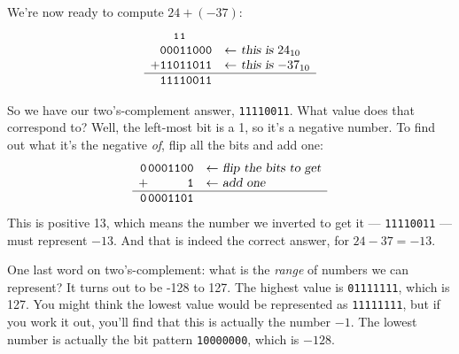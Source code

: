 We're now ready to compute $24 + (-37)$:
\[
\begin{array}{*{9}{c@{\hspace{0pt}}}{l}}
& &   & \texttt{{\footnotesize 1}} & \texttt{{\footnotesize 1}} & & & & \\
   & \texttt{0} & \texttt{0} & \texttt{0} & \texttt{1} & \texttt{1} & \texttt{0} & \texttt{0} & \texttt{0} 
& \quad \textsl{$\leftarrow$ this is $24_{10}$}\\
 + & \texttt{1} & \texttt{1} & \texttt{0} & \texttt{1} & \texttt{1} & \texttt{0} & \texttt{1} & \texttt{1} 
& \quad \textsl{$\leftarrow$ this is $-37_{10}$}\\
\hline
   & \texttt{1} & \texttt{1} & \texttt{1} & \texttt{1} & \texttt{0} & \texttt{0} & \texttt{1} & \texttt{1} & \\
\end{array}
\]

So we have our two's-complement answer, \texttt{11110011}. What value
does that correspond to? Well, the left-most bit is a 1, so it's a negative
number. To find out what it's the negative \textit{of}, flip all the bits
and add one:
\[
\begin{array}{*{8}{c@{\hspace{0pt}}}{l}}
 \texttt{0} & \texttt{0} & \texttt{0} & \texttt{0} & \texttt{1} & \texttt{1} & \texttt{0} & \texttt{0} 
& \quad \textsl{$\leftarrow$ flip the bits to get}\\
 + & \texttt{ } & \texttt{ } & \texttt{ } & \texttt{ } & \texttt{ } & \texttt{ } & \texttt{1} 
& \quad \textsl{$\leftarrow$ add one}\\
\hline
 \texttt{0} & \texttt{0} & \texttt{0} & \texttt{0} & \texttt{1} & \texttt{1} & \texttt{0} & \texttt{1} \\
\end{array}
\]
This is positive 13, which means the number we inverted to get it ---
\texttt{11110011} --- must represent $-13$. And that is indeed the
correct answer, for $24-37=-13$.

One last word on two's-complement: what is the \textit{range} of numbers we
can represent? It turns out to be -128 to 127. The highest value is
\texttt{01111111}, which is 127. You might think the lowest value would be
represented as \texttt{11111111}, but if you work it out, you'll find that
this is actually the number $-1$. The lowest number is actually the bit
pattern \texttt{10000000}, which is $-128$.

